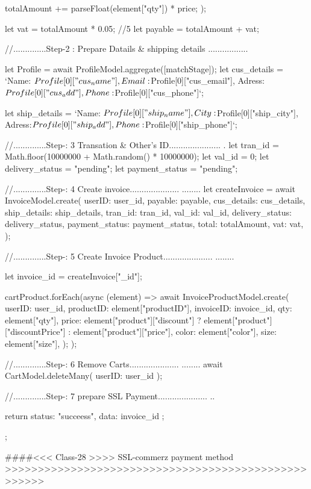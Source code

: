 {{{{    totalAmount += parseFloat(element["qty"]) * price;
  });

  let vat = totalAmount * 0.05; //5%
  let payable = totalAmount + vat;

  //..............Step-2 : Prepare Datails & shipping details .................

  let Profile = await ProfileModel.aggregate([matchStage]);
  let cus_details = `Name: ${Profile[0]["cus_name"]}, Email:${Profile[0]["cus_email"]}, Adress:${Profile[0]["cus_add"]}, Phone:${Profile[0]["cus_phone"]}`;

  let ship_details = `Name: ${Profile[0]["ship_name"]}, City:${Profile[0]["ship_city"]}, Adress:${Profile[0]["ship_add"]}, Phone:${Profile[0]["ship_phone"]}`;

  //..............Step-: 3 Transation & Other's ID...................... .
  let tran_id = Math.floor(10000000 + Math.random() * 10000000);
  let val_id = 0;
  let delivery_status = "pending";
  let payment_status = "pending";

  //..............Step-: 4 Create invoice..................... ........
  let createInvoice = await InvoiceModel.create({
    userID: user_id,
    payable: payable,
    cus_details: cus_details,
    ship_details: ship_details,
    tran_id: tran_id,
    val_id: val_id,
    delivery_status: delivery_status,
    payment_status: payment_status,
    total: totalAmount,
    vat: vat,
  });

  //..............Step-: 5 Create Invoice Product..................... ........

  let invoice_id = createInvoice["_id"];

  cartProduct.forEach(async (element) => {
    await InvoiceProductModel.create({
      userID: user_id,
      productID: element["productID"],
      invoiceID: invoice_id,
      qty: element["qty"],
      price: element["product"]["discount"]
        ? element["product"]["discountPrice"]
        : element["product"]["price"],
      color: element["color"],
      size: element["size"],
    });
  });

  //..............Step-: 6 Remove Carts..................... ........
  await CartModel.deleteMany({ userID: user_id });

  //..............Step-: 7 prepare SSL Payment..................... ..

  return { status: "succeess", data: invoice_id };
};


####<<< Class-28 >>>> SSL-commerz payment method  >>>>>>>>>>>>>>>>>>>>>>>>>>>>>>>>>>>>>>>>>>>>>>>>>>>>



}}
